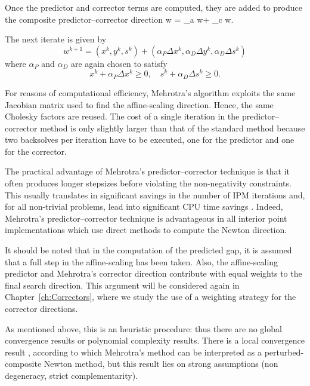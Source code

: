 Once the predictor and corrector terms are computed, they are 
added to produce the composite predictor--corrector direction
\be \label{eq:CompositeDirection}
\Delta w = \Delta_a w+ \Delta_c w.
\ee

The next iterate is given by
\[
w^{k+1} = (x^k,y^k,s^k)
        + (\alpha_P\Delta x^k,\alpha_D\Delta y^k,\alpha_D\Delta s^k)
\]
where $\alpha_P$ and $\alpha_D$ are again chosen to satisfy
\[
x^k+\alpha_P\Delta x^k \ge 0, \quad s^k+\alpha_D\Delta s^k \ge 0.
\]

For reasons of computational efficiency, Mehrotra's algorithm exploits 
the same Jacobian matrix used to find the affine-scaling direction. 
Hence, the same Cholesky factors are reused.
The cost of a single iteration in the predictor--corrector 
method is only slightly larger than that of the standard 
method because two backsolves per iteration have to be executed, 
one for the predictor and one for the corrector. 

The practical advantage of Mehrotra's predictor--corrector technique
is that it often produces longer stepsizes before violating the 
non-negativity constraints.
%
This usually translates in significant savings in the number of IPM 
iterations and, for all non-trivial problems, lead into significant 
CPU time savings \cite{LustigMarstenShanno,Mehrotra92}. Indeed, 
Mehrotra's predictor--corrector technique is advantageous in all 
interior point implementations which use direct methods to compute 
the Newton direction.

It should be noted that in the computation of the predicted gap, 
it is assumed that a full step in the affine-scaling has been taken. 
Also, the affine-scaling predictor and Mehrotra's corrector direction 
contribute with equal weights to the final search direction. 
This argument will be considered again in Chapter~\ref{ch:Correctors}, 
where we study the use of a weighting strategy for the corrector
directions.

As mentioned above, this is an heuristic procedure: thus there are 
no global convergence results or polynomial complexity results. 
There is a local convergence result \cite{TapiaZhangSaltzmanWeiser}, 
according to which Mehrotra's method can be interpreted as a 
perturbed-composite Newton method, but this result lies on strong 
assumptions (non degeneracy, strict complementarity).


